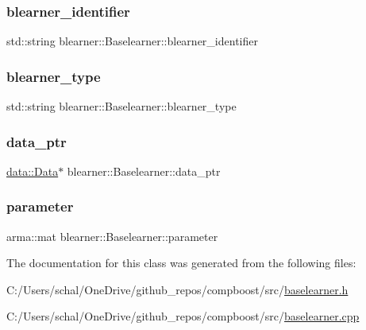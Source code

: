 \subsubsection{\texorpdfstring{blearner\+\_\+identifier}{blearner\_identifier}}
{\footnotesize\ttfamily std\+::string blearner\+::\+Baselearner\+::blearner\+\_\+identifier\hspace{0.3cm}{\ttfamily [protected]}}

\mbox{\label{classblearner_1_1_baselearner_aed6406144af33850b3cb9222dddf3f57}} 
\subsubsection{\texorpdfstring{blearner\+\_\+type}{blearner\_type}}
{\footnotesize\ttfamily std\+::string blearner\+::\+Baselearner\+::blearner\+\_\+type\hspace{0.3cm}{\ttfamily [protected]}}

\mbox{\label{classblearner_1_1_baselearner_a5b5cfab411ff94a13bcce4ca0dd4e507}} 
\subsubsection{\texorpdfstring{data\+\_\+ptr}{data\_ptr}}
{\footnotesize\ttfamily \mbox{\hyperlink{classdata_1_1_data}{data\+::\+Data}}$\ast$ blearner\+::\+Baselearner\+::data\+\_\+ptr\hspace{0.3cm}{\ttfamily [protected]}}

\mbox{\label{classblearner_1_1_baselearner_a56e401f574b274d65e364493277f3247}} 
\subsubsection{\texorpdfstring{parameter}{parameter}}
{\footnotesize\ttfamily arma\+::mat blearner\+::\+Baselearner\+::parameter\hspace{0.3cm}{\ttfamily [protected]}}



The documentation for this class was generated from the following files\+:\begin{DoxyCompactItemize}
\item 
C\+:/\+Users/schal/\+One\+Drive/github\+\_\+repos/compboost/src/\mbox{\hyperlink{baselearner_8h}{baselearner.\+h}}\item 
C\+:/\+Users/schal/\+One\+Drive/github\+\_\+repos/compboost/src/\mbox{\hyperlink{baselearner_8cpp}{baselearner.\+cpp}}\end{DoxyCompactItemize}
